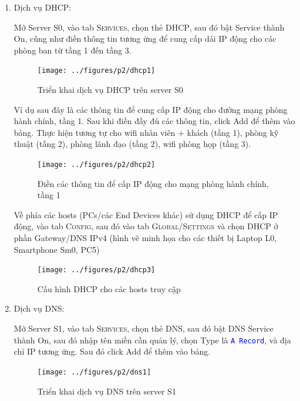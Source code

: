 \begin{enumerate}
\rm 
\begin{enumerate}
\item Dịch vụ DHCP:

Mở Server \textsc{S0}, vào tab \textsc{Services}, chọn thẻ \textsc{DHCP}, sau đó bật Service thành On, cũng như điền thông tin tương ứng để cung cấp dải IP động cho các phòng ban từ tầng 1 đến tầng 3.

\begin{figure}[H]
\begin{center}
\texttt{[image: ../figures/p2/dhcp1]}
\end{center}
\caption{Triển khai dịch vụ DHCP trên server S0}
\end{figure}

Ví dụ sau đây là các thông tin để cung cấp IP động cho đường mạng phòng hành chính, tầng 1. Sau khi điền đầy đủ các thông tin, click Add để thêm vào bảng. Thực hiện tương tự cho wifi nhân viên + khách (tầng 1), phòng kỹ thuật (tầng 2), phòng lãnh đạo (tầng 2), wifi phòng họp (tầng 3). 
\begin{figure}[H]
\begin{center}
\texttt{[image: ../figures/p2/dhcp2]}
\end{center}
\caption{Điền các thông tin để cấp IP động cho mạng phòng hành chính, tầng 1}
\end{figure}

Về phía các hosts (PCs/các End Devices khác) sử dụng DHCP để cấp IP động, vào tab \textsc{Config}, sau đó vào tab \textsc{Global/Settings} và chọn DHCP ở phần Gateway/DNS IPv4 (hình vẽ minh họa cho các thiết bị Laptop L0, Smartphone Sm0, PC5)
\begin{figure}[H]
\begin{center}
\texttt{[image: ../figures/p2/dhcp3]}
\end{center}
\caption{Cấu hình DHCP cho các hosts truy cập}
\end{figure}

\item Dịch vụ DNS: 

Mở Server \textsc{S1}, vào tab \textsc{Services}, chọn thẻ \textsc{DNS}, sau đó bật DNS Service thành On, sau đó nhập tên miền cần quản lý, chọn Type là \texttt{\textcolor{blue}{A Record}}, và địa chỉ IP tương ứng. Sau đó click Add để thêm vào bảng.

\begin{figure}[H]
\begin{center}
\texttt{[image: ../figures/p2/dns1]}
\end{center}
\caption{Triển khai dịch vụ DNS trên server S1}
\end{figure}


\end{enumerate}
\end{enumerate}
